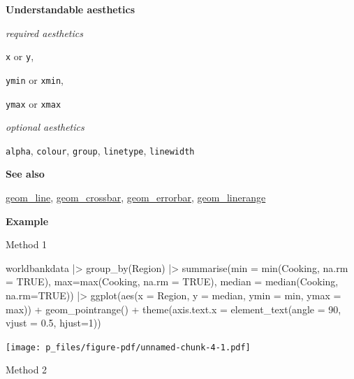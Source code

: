 \documentclass[
  letterpaper,
  DIV=11,
  numbers=noendperiod]{scrreprt}
\newenvironment{Shaded}{\begin{snugshade}}{\end{snugshade}}
\newcommand{\AttributeTok}[1]{\textcolor[rgb]{0.40,0.45,0.13}{#1}}
\newcommand{\ConstantTok}[1]{\textcolor[rgb]{0.56,0.35,0.01}{#1}}
\newcommand{\DecValTok}[1]{\textcolor[rgb]{0.68,0.00,0.00}{#1}}
\newcommand{\FloatTok}[1]{\textcolor[rgb]{0.68,0.00,0.00}{#1}}
\newcommand{\FunctionTok}[1]{\textcolor[rgb]{0.28,0.35,0.67}{#1}}
\newcommand{\NormalTok}[1]{\textcolor[rgb]{0.00,0.23,0.31}{#1}}
\newcommand{\SpecialCharTok}[1]{\textcolor[rgb]{0.37,0.37,0.37}{#1}}
\begin{document}
\textbf{Understandable aesthetics}

\emph{required aesthetics}

\texttt{x} or \texttt{y},

\texttt{ymin} or \texttt{xmin},

\texttt{ymax} or \texttt{xmax}

\emph{optional aesthetics}

\texttt{alpha}, \texttt{colour}, \texttt{group}, \texttt{linetype},
\texttt{linewidth}

\textbf{See also}

\hyperref[line]{geom\_line}, \hyperref[crossbar]{geom\_crossbar},
\hyperref[errorbar]{geom\_errorbar},
\hyperref[linerange]{geom\_linerange}

\textbf{Example}

Method 1

\begin{Shaded}
\begin{Highlighting}[]
\NormalTok{worldbankdata }\SpecialCharTok{|\textgreater{}}
  \FunctionTok{group\_by}\NormalTok{(Region) }\SpecialCharTok{|\textgreater{}}
  \FunctionTok{summarise}\NormalTok{(}\AttributeTok{min =} \FunctionTok{min}\NormalTok{(Cooking, }\AttributeTok{na.rm =} \ConstantTok{TRUE}\NormalTok{), }\AttributeTok{max=}\FunctionTok{max}\NormalTok{(Cooking, }
                                                      \AttributeTok{na.rm =} \ConstantTok{TRUE}\NormalTok{),}
            \AttributeTok{median =} \FunctionTok{median}\NormalTok{(Cooking, }\AttributeTok{na.rm=}\ConstantTok{TRUE}\NormalTok{)) }\SpecialCharTok{|\textgreater{}}
  \FunctionTok{ggplot}\NormalTok{(}\FunctionTok{aes}\NormalTok{(}\AttributeTok{x =}\NormalTok{ Region, }\AttributeTok{y =}\NormalTok{ median, }\AttributeTok{ymin =}\NormalTok{ min, }\AttributeTok{ymax =}\NormalTok{ max)) }\SpecialCharTok{+}
  \FunctionTok{geom\_pointrange}\NormalTok{() }\SpecialCharTok{+} 
  \FunctionTok{theme}\NormalTok{(}\AttributeTok{axis.text.x =} \FunctionTok{element\_text}\NormalTok{(}\AttributeTok{angle =} \DecValTok{90}\NormalTok{, }\AttributeTok{vjust =} \FloatTok{0.5}\NormalTok{, }\AttributeTok{hjust=}\DecValTok{1}\NormalTok{))}
\end{Highlighting}
\end{Shaded}

\texttt{[image: p\_files/figure-pdf/unnamed-chunk-4-1.pdf]}

Method 2
\end{document}

